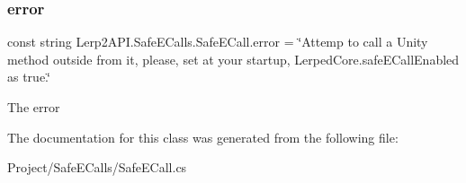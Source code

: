 \subsubsection{\texorpdfstring{error}{error}}
{\footnotesize\ttfamily const string Lerp2\+A\+P\+I.\+Safe\+E\+Calls.\+Safe\+E\+Call.\+error = \char`\"{}Attemp to call a Unity method outside from it, please, set at your startup, \textquotesingle{}Lerped\+Core.\+safe\+E\+Call\+Enabled\textquotesingle{} as true.\char`\"{}}



The error 



The documentation for this class was generated from the following file\+:\begin{DoxyCompactItemize}
\item 
Project/\+Safe\+E\+Calls/Safe\+E\+Call.\+cs\end{DoxyCompactItemize}
